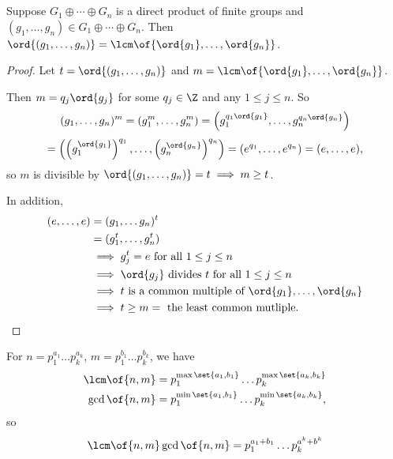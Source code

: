 \chapter{}

\begin{theorem}
    Suppose $G_1 \oplus \cdots \oplus G_n$ is a direct product of finite groups and $(g_1, \dots, g_n) \in G_1 \oplus \cdots \oplus G_n$. Then $\ord{(g_1,\dots,g_n)} = \lcm\of{\ord{g_1}, \dots, \ord{g_n}}$.
\end{theorem}
\begin{proof}
    Let $t = \ord{(g_1, \dots, g_n)}$ and $m = \lcm\of{\ord{g_1},\dots, \ord{g_n}}$.

    Then $m = q_j \ord{g_j}$ for some $q_j \in \Z$ and any $1 \leq j \leq n$. So \[(g_1, \dots, g_n)^m = (g_1^m, \dots, g_n^m) = \left(g_1^{q_1 \ord{g_1}}, \dots, g_n^{q_n \ord{g_n}}\right) \]\[= \left(\left(g_1^{\ord{g_1}}\right)^{q_1}, \dots, \left(g_n^{\ord{g_n}}\right)^{q_n}\right) = (e^{q_1}, \dots, e^{q_n}) = (e, \dots, e),\]
    so $m$ is divisible by $\ord{(g_1, \dots, g_n)} = t \implies m \geq t$.

    In addition, \begin{align*}
        (e, \dots, e) &= (g_1, \dots g_n)^t \\
        &= (g_1^t, \dots, g_n^t) \\
        &\implies g_j^t = e \text{ for all } 1 \leq j \leq n \\
        &\implies \ord{g_j} \text{ divides } t \text{ for all } 1 \leq j \leq n \\
        &\implies t \text{ is a common multiple of } \ord{g_1}, \dots, \ord{g_n} \\
        &\implies t \geq m = \text{ the least common mutliple}.
    \end{align*}
\end{proof}

\begin{remark}
    For $n = p_1^{a_1} \dots p_k^{a_k}$, $m = p_1^{b_1} \dots p_k^{b_k}$, we have
    \begin{align*}
        \lcm\of{n,m} &= p_1^{\max\set{a_1,b_1}} \dots p_k^{\max\set{a_k,b_k}} \\
        \gcd\of{n,m} &= p_1^{\min\set{a_1,b_1}} \dots p_k^{\min\set{a_k,b_k}},
    \end{align*}
    so \[\lcm\of{n,m} \gcd\of{n,m} = p_1^{a_1 + b_1} \dots p_k^{a^k + b^k}\]
\end{remark}

